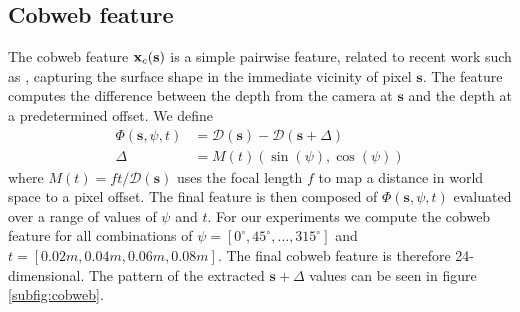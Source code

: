 \documentclass[10pt,twocolumn,letterpaper]{article}
\newcommand{\degree}{^{\circ}}
\newcommand{\rgbdimage}{\mathcal{D}}
\newcommand{\pixelidx}{\mathbf{s}}
\newcommand{\note}[1]{\textcolor{blue}{NOTE: #1}}
\begin{document}
\subsection{Cobweb feature }
The cobweb feature $\feat_c(\pixelidx)$ is a simple pairwise feature, related to recent work such as \cite{shotton-cvpr-2011, tola-pami-2010}, capturing the surface shape in the immediate vicinity of pixel $\pixelidx$.
The feature computes the difference between the depth from the camera at $\pixelidx$ and the depth at a predetermined offset. We define
\begin{align}
\Phi(\pixelidx, \psi, t) &= \rgbdimage(\pixelidx) - \rgbdimage(\pixelidx + \Delta) \\
\Delta &= M(t) (\sin(\psi), \cos(\psi))
\end{align}
where $M(t) = ft / \rgbdimage(\pixelidx)$ uses the focal length $f$ to map a distance in world space to a pixel offset. 
The final feature is then composed of $\Phi(\pixelidx, \psi, t)$ evaluated over a range of values of $\psi$ and $t$.
For our experiments we compute the cobweb feature for all combinations of $\psi = [0\degree, 45\degree, \ldots, 315\degree]$ and $t = [0.02m, 0.04m, 0.06m, 0.08m]$.
The final cobweb feature is therefore 24-dimensional.
The pattern of the extracted $\pixelidx + \Delta$ values can be seen in figure \ref{subfig:cobweb}.



\end{document}
